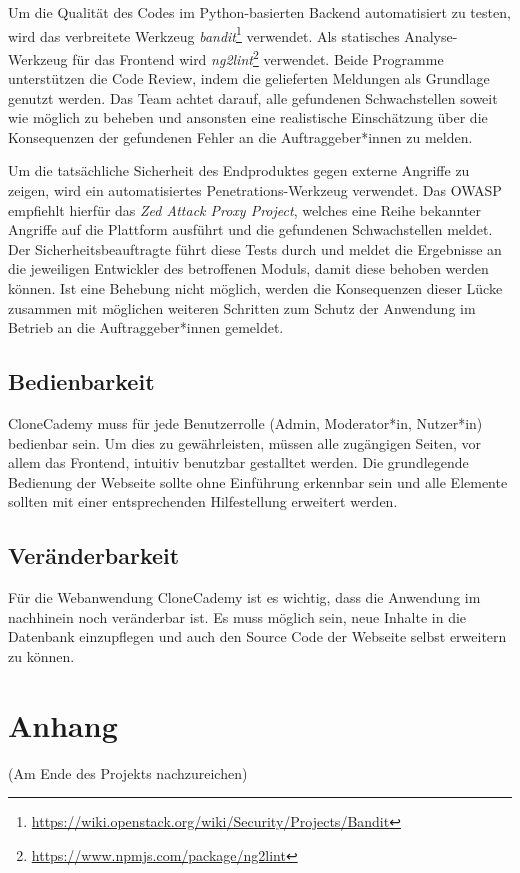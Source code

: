 \documentclass[accentcolor=tud0b,12pt,paper=a4]{tudreport}
\begin{document}
Um die Qualität des Codes im Python-basierten Backend automatisiert zu testen, wird das verbreitete Werkzeug \emph{bandit}\footnote{\href{https://wiki.openstack.org/wiki/Security/Projects/Bandit}{https://wiki.openstack.org/wiki/Security/Projects/Bandit}} verwendet. Als statisches Analyse-Werkzeug für das Frontend wird \emph{ng2lint}\footnote{\href{https://www.npmjs.com/package/ng2lint}{https://www.npmjs.com/package/ng2lint}} verwendet. Beide Programme unterstützen die Code Review, indem die gelieferten Meldungen als Grundlage genutzt werden. Das Team achtet darauf, alle gefundenen Schwachstellen soweit wie möglich zu beheben und ansonsten eine realistische Einschätzung über die Konsequenzen der gefundenen Fehler an die Auftraggeber*innen zu melden.

Um die tatsächliche Sicherheit des Endproduktes gegen externe Angriffe zu zeigen, wird ein automatisiertes Penetrations-Werkzeug verwendet. Das OWASP empfiehlt hierfür das \emph{Zed Attack Proxy Project}, welches eine Reihe bekannter Angriffe auf die Plattform ausführt und die gefundenen Schwachstellen meldet. Der Sicherheitsbeauftragte führt diese Tests durch und meldet die Ergebnisse an die jeweiligen Entwickler des betroffenen Moduls, damit diese behoben werden können. Ist eine Behebung nicht möglich, werden die Konsequenzen dieser Lücke zusammen mit möglichen weiteren Schritten zum Schutz der Anwendung im Betrieb an die Auftraggeber*innen gemeldet.

\section{Bedienbarkeit}
CloneCademy muss für jede Benutzerrolle (Admin, Moderator*in, Nutzer*in) bedienbar sein. Um dies zu gewährleisten, müssen alle zugängigen Seiten, vor allem das Frontend, intuitiv benutzbar gestalltet werden. Die grundlegende Bedienung der Webseite sollte ohne Einführung erkennbar sein und alle Elemente sollten mit einer entsprechenden Hilfestellung erweitert werden.

\section{Veränderbarkeit}
Für die Webanwendung CloneCademy ist es wichtig, dass die Anwendung im nachhinein noch veränderbar ist. Es muss möglich sein, neue Inhalte in die Datenbank einzupflegen und auch den Source Code der Webseite selbst erweitern zu können.




\appendix
	\chapter{Anhang}
		(Am Ende des Projekts nachzureichen)\\
\end{document}
